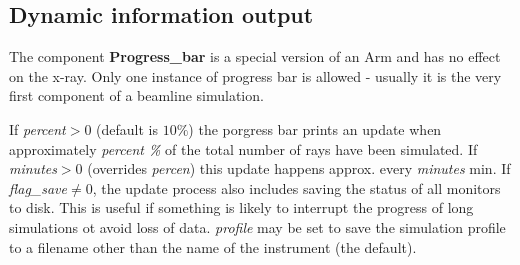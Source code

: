 \subsection*{Dynamic information output}
\label{s:progress-bar}
The component \textbf{Progress\_bar} is a special version of an Arm and has no effect on the x-ray.
Only one instance of progress bar is allowed - usually it is the very first component of a beamline simulation.

If \textit{percent}$>0$ (default is $10\%$) the porgress bar prints an update when approximately \textit{percent \% } of the total number of rays
have been simulated. If \textit{minutes}$>0$ (overrides \textit{percen}) this update happens approx. every \textit{minutes} min.
If \textit{flag\_save}$\ne 0$, the update process also includes saving the status of all monitors to disk. This is useful if something is likely to interrupt the progress of long simulations ot avoid loss of data.
\textit{profile} may be set to save the simulation profile to a filename other than the name of the instrument (the default).
